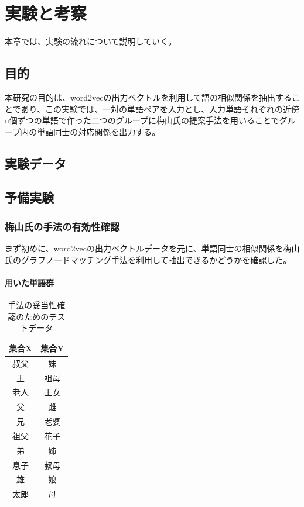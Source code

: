 \chapter{実験と考察}
本章では、実験の流れについて説明していく。

\section{目的}
本研究の目的は、word2vecの出力ベクトルを利用して語の相似関係を抽出することであり、この実験では、一対の単語ペアを入力とし、入力単語それぞれの近傍n個ずつの単語で作った二つのグループに梅山氏の提案手法を用いることでグループ内の単語同士の対応関係を出力する。

\section{実験データ}
\section{予備実験}
\subsection{梅山氏の手法の有効性確認}
まず初めに、word2vecの出力ベクトルデータを元に、単語同士の相似関係を梅山氏のグラフノードマッチング手法を利用して抽出できるかどうかを確認した。
\subsubsection{用いた単語群}
\begin{table}[h]
  \caption[テストデータ]{手法の妥当性確認のためのテストデータ}
  \begin{tabular}{|c||c|} \hline
    集合X & 集合Y \\ \hline
    叔父 & 妹 \\
    王 & 祖母 \\
    老人 & 王女 \\
    父 & 雌 \\
    兄 & 老婆 \\
    祖父 & 花子 \\
    弟 & 姉 \\
    息子 & 叔母 \\
    雄 & 娘 \\
    太郎 & 母 \\ \hline
  \end{tabular}
\end{table}

